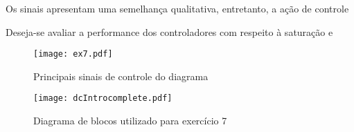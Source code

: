 Os sinais apresentam uma semelhança qualitativa, entretanto, a ação de controle 

Deseja-se avaliar a performance dos controladores com respeito à saturação e 

\begin{figure}[H]
    \center
    \texttt{[image: ex7.pdf]}
    \caption{Principais sinais de controle do diagrama} \label{fig:dcIntrocomplete}
\end{figure}

\begin{figure}[H]
    \center
    \texttt{[image: dcIntrocomplete.pdf]}
    \caption{Diagrama de blocos utilizado para exercício 7}
    \label{fig:ex7}
\end{figure}

